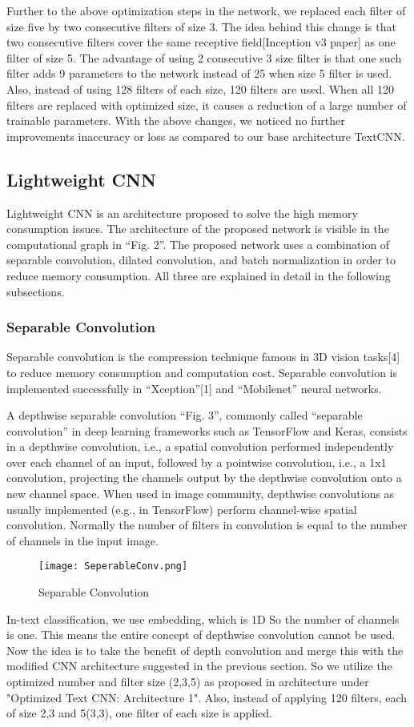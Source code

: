 \documentclass[conference]{IEEEtran}
\begin{document}
Further to the above optimization steps in the network, we replaced each filter of size five by two consecutive filters of size 3. The idea behind this change is that two consecutive filters cover the same receptive field[Inception v3 paper] as one filter of size 5. The advantage of using 2 consecutive 3 size filter is that one such filter adds 9 parameters to the network instead of 25 when size 5 filter is used. Also, instead of using 128 filters of each size, 120 filters are used. When all 120 filters are replaced with optimized size, it causes a reduction of a large number of trainable parameters. 
With the above changes, we noticed no further improvements inaccuracy or loss as compared to our base architecture TextCNN.

\subsection{Lightweight CNN}
Lightweight CNN is an architecture proposed to solve the high memory consumption issues. The architecture of the proposed network is visible in the computational graph in “Fig. 2”. The proposed network uses a combination of separable convolution, dilated convolution, and batch normalization in order to reduce memory consumption. All three are explained in detail in the following subsections.

\subsubsection{Separable Convolution}
Separable convolution is the compression technique famous in 3D vision tasks[4] to reduce memory consumption and computation cost. Separable convolution is implemented successfully in “Xception”[1] and “Mobilenet” neural networks.


A depthwise separable convolution “Fig. 3”, commonly called “separable convolution” in deep learning frameworks such as TensorFlow and Keras, consists in a depthwise convolution, i.e., a spatial convolution performed independently over each channel of an input, followed by a pointwise convolution, i.e., a 1x1 convolution, projecting the channels output by the depthwise convolution onto a new channel space. When used in image community, depthwise convolutions as usually implemented (e.g., in TensorFlow) perform channel-wise spatial convolution. Normally the number of filters in convolution is equal to the number of channels in the input image. 

\begin{figure*}[htbp]
\centerline{\texttt{[image: SeperableConv.png]}}
\caption{Separable Convolution}
\label{fig}
\end{figure*}
In-text classification, we use embedding, which is 1D So the number of channels is one. This means the entire concept of depthwise convolution cannot be used. Now the idea is to take the benefit of depth convolution and merge this with the modified CNN architecture suggested in the previous section. So we utilize the optimized number and filter size (2,3,5) as proposed in architecture under "Optimized Text CNN: Architecture 1". Also, instead of applying 120 filters, each of size 2,3 and 5(3,3), one filter of each size is applied.
\end{document}
